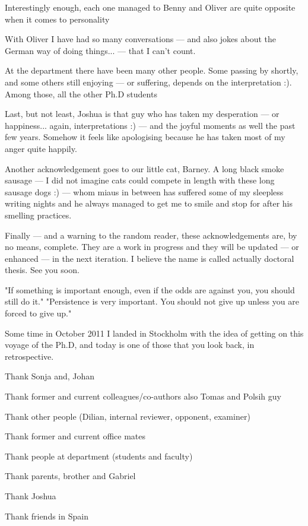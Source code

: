 Interestingly enough, each one managed to Benny and Oliver are quite opposite when it comes to personality 

With Oliver I have had 
so many conversations --- and also jokes about the German way of doing things... --- 
that I can't count.

At the department there have been many other people. Some passing by shortly, and 
some others still enjoying --- or suffering, depends on the interpretation :). Among 
those, all the other Ph.D students 

Last, but not least, Joshua is that guy who has taken my desperation --- or happiness... 
again, interpretations :) --- and the joyful moments as well the past few years. 
Somehow it feels like apologising because he has taken most of my anger quite happily.

Another acknowledgement goes to our little cat, Barney. A long black smoke sausage --- 
I did not imagine cats could compete in length with these long sausage dogs :) --- 
whom miaus in between has suffered some of my sleepless writing nights and he always 
managed to get me to smile and stop for after his smelling practices.

Finally --- and a warning to the random reader, these acknowledgements are, by no 
means, complete. They are a work in progress and they will be updated --- or enhanced ---
in the next iteration. I believe the name is called actually doctoral thesis. See 
you soon.

"If something is important enough, even if the odds are against you, you should still do it."
"Persistence is very important. You should not give up unless you are forced to give up."

Some time in October 2011 I landed in Stockholm with the idea of getting on this 
voyage of the Ph.D, and today is one of those that you look back, in retrospective.

Thank Sonja and, Johan

Thank former and current colleagues/co-authors also Tomas and Polsih guy

Thank other people (Dilian, internal reviewer, opponent, examiner)

Thank former and current office mates

Thank people at department (students and faculty)

Thank parents, brother and Gabriel

Thank Joshua

Thank friends in Spain

